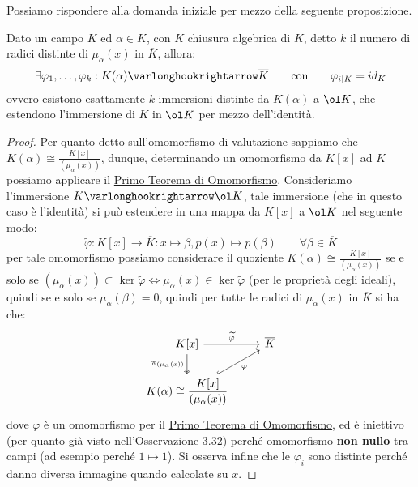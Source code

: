 \documentclass[11pt]{scrartcl}
\begin{document}
Possiamo rispondere alla domanda iniziale per mezzo della seguente proposizione.

\begin{proposition}
    \label{3.33}
    Dato un campo $K$ ed $\alpha \in \overline K$, con $\overline K$ chiusura algebrica di $K$, detto $k$ il numero di radici distinte di $\mu_\alpha(x)$ in $\overline K$, allora:
    \[ \exists \varphi_1,\ldots,\varphi_k : K(\alpha) \varlonghookrightarrow \overline K \qquad \text{con} \qquad \varphi_{i|K} = id_K
        \]
    ovvero esistono esattamente $k$ immersioni distinte da $K(\alpha)$ a $\ol K$, che estendono l'immersione di $K$ in $\ol K$ per mezzo dell'identità.
\end{proposition}

\begin{proof}
    Per quanto detto sull'omomorfismo di valutazione sappiamo che $\displaystyle K(\alpha) \cong \frac{K[x]}{(\mu_\alpha(x))}$, dunque, determinando un omomorfismo da $K[x]$ ad $\overline K$ possiamo applicare il 
    \hyperref[omo]{Primo Teorema di Omomorfismo}. Consideriamo l'immersione $K \varlonghookrightarrow \ol K$, tale immersione (che in questo caso è l'identità) si può estendere in una mappa da $K[x]$ a $\ol K$ nel seguente modo:
    \[ \widetilde{\varphi} : K[x] \longrightarrow \overline K : x \longmapsto \beta , p(x) \longmapsto p(\beta) \qquad \forall \beta \in \overline K
        \]
    per tale omomorfismo possiamo considerare il quoziente $\displaystyle K(\alpha) \cong \frac{K[x]}{(\mu_\alpha(x))}$ se e solo se $(\mu_\alpha(x)) \subset \ker \widetilde{\varphi} \iff \mu_\alpha(x) \in \ker \widetilde{\varphi}$ (per le proprietà degli ideali), quindi se e solo se $\mu_\alpha(\beta) = 0$,
    quindi per tutte le radici di $\mu_\alpha(x)$ in $\overline K$ si ha che:
    \[\begin{tikzcd}
		K[x] \arrow[d, "\pi_{(\mu_\alpha(x))}" left, twoheadrightarrow] \arrow[r, "\widetilde{\varphi}"] & \overline K \\	
		\displaystyle K(\alpha) \cong \frac{K[x]}{(\mu_\alpha(x))} \arrow[ur, "\varphi"', hookrightarrow] & 
	\end{tikzcd}
        \]
    dove $\varphi$ è un omomorfismo per il \hyperref[omo]{Primo Teorema di Omomorfismo}, ed è iniettivo (per quanto già visto nell'\hyperref[3.32]{Osservazione 3.32}) perché omomorfismo \textbf{non nullo} tra campi (ad esempio perché $1 \longmapsto 1$). Si osserva infine che 
    le $\varphi_i$ sono distinte perché danno diversa immagine quando calcolate su $x$.
\end{proof}
\end{document}
